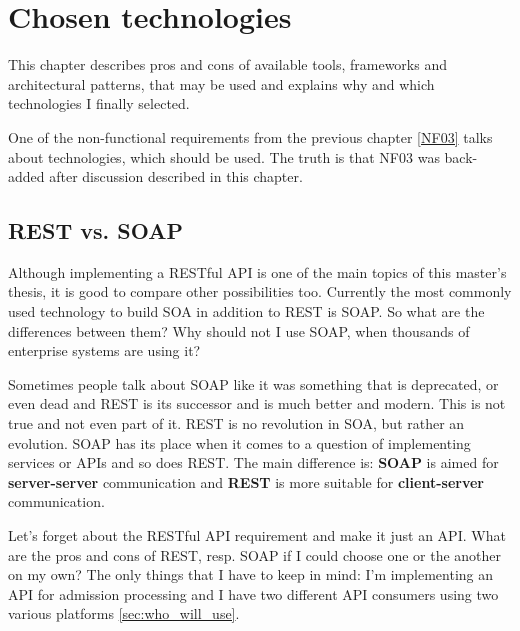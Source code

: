 \chapter{Chosen technologies}\label{cha:technologies}

	This chapter describes pros and cons of available tools, frameworks and architectural patterns, that may be used and
	explains why and which technologies I finally selected.
	
	One of the non-functional requirements from the previous chapter \ref{NF03} talks about technologies, which should be
	used. The truth is that NF03 was back-added after discussion described in this chapter.

	\section{REST vs. SOAP}
	
	Although implementing a RESTful API is one of the main topics of this master's thesis, it is good to compare other
	possibilities too. Currently the most commonly used technology to build SOA in addition to REST is SOAP. So what are
	the differences between them? Why should not I use SOAP, when thousands of enterprise systems are using it?
	
	Sometimes people talk about SOAP like it was something that is deprecated, or even dead and REST is its successor and
	is much better and modern. This is not true and not even part of it. REST is no revolution in SOA, but rather
	an evolution. SOAP has its place when it comes to a question of implementing services or APIs and so does REST. The
	main difference is: \textbf{SOAP} is aimed for \textbf{server-server} communication and \textbf{REST} is more suitable
	for \textbf{client-server} communication.
	
	Let's forget about the RESTful API requirement and make it just an API. What are the pros and cons of REST, resp. SOAP
	if I could choose one or the another on my own? The only things that I have to keep in mind: I'm implementing an API
	for admission processing and I have two different API consumers using two various platforms \ref{sec:who_will_use}.
	
